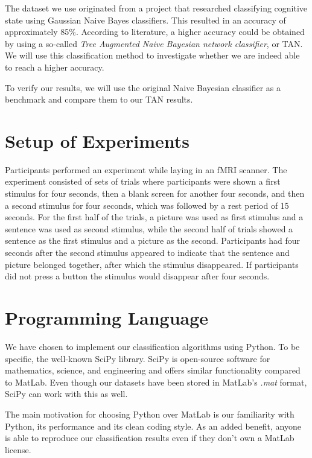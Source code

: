 \documentclass[a4paper, 11pt]{scrartcl}
\begin{document}
The dataset we use originated from a project that researched classifying cognitive state using Gaussian Naive Bayes classifiers. This resulted in an accuracy of approximately 85\%. According to literature\cite{Friedman:1997gw}, a higher accuracy could be obtained by using a so-called \textit{Tree Augmented Naive Bayesian network classifier}, or TAN. We will use this classification method to investigate whether we are indeed able to reach a higher accuracy.

To verify our results, we will use the original Naive Bayesian classifier as a benchmark and compare them to our TAN results.

\section{Setup of Experiments}
\label{sec:setup}

Participants performed an experiment while laying in an fMRI scanner. The experiment consisted of sets of trials where participants were shown a first stimulus for four seconds, then a blank screen for another four seconds, and then a second stimulus for four seconds, which was followed by a rest period of 15 seconds. For the first half of the trials, a picture was used as first stimulus and a sentence was used as second stimulus, while the second half of trials showed a sentence as the first stimulus and a picture as the second. Participants had four seconds after the second stimulus appeared to indicate that the sentence and picture belonged together, after which the stimulus disappeared. If participants did not press a button the stimulus would disappear after four seconds.

\section{Programming Language}
\label{sec:language}

We have chosen to implement our classification algorithms using Python. To be specific,  the well-known SciPy library. SciPy is open-source software for mathematics, science, and engineering and offers similar functionality compared to MatLab. Even though our datasets have been stored in MatLab's \textit{.mat} format, SciPy can work with this as well.

The main motivation for choosing Python over MatLab is our familiarity with Python, its performance and its clean coding style. As an added benefit, anyone is able to reproduce our classification results even if they don't own a MatLab license.
\end{document}
